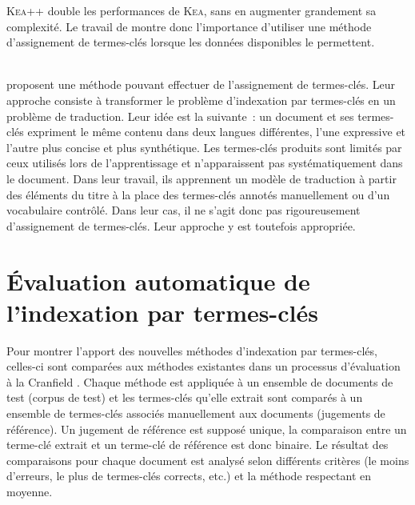     \textsc{Kea}++ double les performances de \textsc{Kea}, sans en augmenter
    grandement sa complexité. Le travail de
     montre donc l'importance d'utiliser
    une méthode d'assignement de termes-clés lorsque les données disponibles le
    permettent.

    ~\\ proposent une méthode pouvant effectuer de
    l'assignement de termes-clés. Leur approche consiste à transformer le
    problème d'indexation par termes-clés en un problème de traduction. Leur
    idée est la suivante~: un document et ses termes-clés expriment le même
    contenu dans deux langues différentes, l'une expressive et l'autre plus
    concise et plus synthétique. Les termes-clés produits sont limités par ceux
    utilisés lors de l'apprentissage  et n'apparaissent pas systématiquement
    dans le document. Dans leur travail, ils apprennent un modèle de traduction
    à partir des éléments du titre à la place des termes-clés annotés
    manuellement ou d'un vocabulaire contrôlé. Dans leur cas, il ne s'agit donc
    pas rigoureusement d'assignement de termes-clés. Leur approche y est
    toutefois appropriée.


  \section{Évaluation automatique de l'indexation par termes-clés}
  \label{sec:main-state_of_the_art-automatic_evaluation_of_keyphrase_annotation}
    Pour montrer l'apport des nouvelles méthodes d'indexation par termes-clés,
    celles-ci sont comparées aux méthodes existantes dans un processus
    d'évaluation \og{}à la Cranfield\fg{} \citep{voorhees2002philosophy}. Chaque
    méthode est appliquée à un ensemble de documents de test (corpus de test) et
    les termes-clés qu'elle extrait sont comparés à un ensemble de termes-clés
    associés manuellement aux documents (jugements de référence). Un jugement de
    référence est supposé unique, la comparaison entre un terme-clé extrait
    et un terme-clé de référence est donc binaire. Le résultat des comparaisons
    pour chaque document est analysé selon différents critères (le moins
    d'erreurs, le plus de termes-clés corrects, etc.) et la méthode respectant
    en moyenne.

